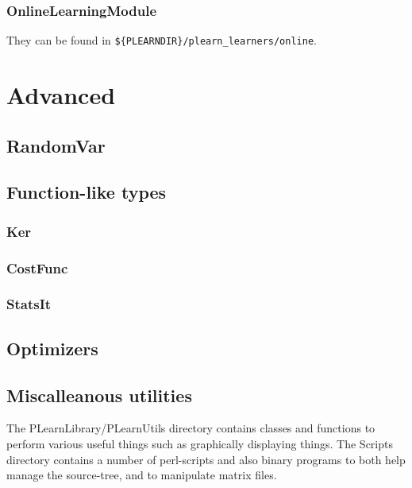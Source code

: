 \documentclass[11pt]{book}
\begin{document}
\subsection{OnlineLearningModule}

They can be found in {\tt \$\{PLEARNDIR\}/plearn\_learners/online}.


\chapter{Advanced}

\section{RandomVar}

\section{Function-like types}
\subsection{Ker}
\subsection{CostFunc}
\subsection{StatsIt}
\section{Optimizers}
\label{Optimizer}

%
%
\section{ Miscalleanous utilities}

 The PLearnLibrary/PLearnUtils directory contains classes and
functions to perform various useful things such as graphically
displaying things. The Scripts directory contains a number of
perl-scripts and also binary programs to both help manage the
source-tree, and to manipulate matrix files.
\end{document}
